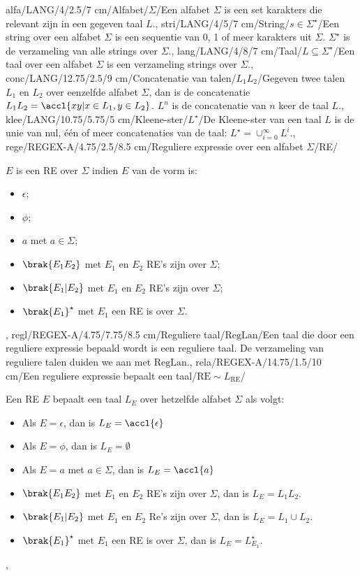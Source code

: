 alfa/LANG/4/2.5/7 cm/Alfabet/{$\Sigma$}/{Een alfabet $\Sigma$ is een set karakters die relevant zijn in een gegeven taal $L$.},
stri/LANG/4/5/7 cm/String/{$s\in\Sigma^{\star}$}/{Een string over een alfabet $\Sigma$ is een sequentie van 0, 1 of meer karakters uit $\Sigma$. $\Sigma^{\star}$ is de verzameling van alle strings over $\Sigma$.},
lang/LANG/4/8/7 cm/Taal/{$L\subseteq\Sigma^{\star}$}/{Een taal over een alfabet $\Sigma$ is een verzameling strings over $\Sigma$.},
conc/LANG/12.75/2.5/9 cm/Concatenatie van talen/{$L_1L_2$}/{Gegeven twee talen $L_1$ en $L_2$ over eenzelfde alfabet $\Sigma$, dan is de concatenatie $L_1L_2=\accl{xy|x\in L_1,y\in L_2}$. $L^n$ is de concatenatie van $n$ keer de taal $L$.},
klee/LANG/10.75/5.75/5 cm/Kleene-ster/{$L^{\star}$}/{De Kleene-ster van een taal $L$ is de unie van nul, \'e\'en of meer concatenaties van de taal: $L^{\star}=\displaystyle\cup_{i=0}^{\infty}{L^i}$.},
rege/REGEX-A/4.75/2.5/8.5 cm/Reguliere expressie over een alfabet $\Sigma$/RE/{$E$ is een RE over $\Sigma$ indien $E$ van de vorm is:\begin{itemize}\item $\epsilon$;\item $\phi$;\item $a$ met $a\in\Sigma$;\item $\brak{E_1E_2}$ met $E_1$ en $E_2$ RE's zijn over $\Sigma$;\item $\brak{E_1|E_2}$ met $E_1$ en $E_2$ RE's zijn over $\Sigma$;\item $\brak{E_1}^{\star}$ met $E_1$ een RE is over $\Sigma$.\end{itemize}},
regl/REGEX-A/4.75/7.75/8.5 cm/Reguliere taal/$\mbox{RegLan}$/{Een taal die door een reguliere expressie bepaald wordt is een reguliere taal. De verzameling van reguliere talen duiden we aan met $\mbox{RegLan}$.},
rela/REGEX-A/14.75/1.5/10 cm/Een reguliere expressie bepaalt een taal/$\mbox{RE}\sim L_{\mbox{RE}}$/{Een RE $E$ bepaalt een taal $L_E$ over hetzelfde alfabet $\Sigma$ als volgt:\begin{itemize}\item Als $E=\epsilon$, dan is $L_E=\accl{\epsilon}$\item Als $E=\phi$, dan is $L_E=\emptyset$\item Als $E=a$ met $a\in\Sigma$, dan is $L_E=\accl{a}$\item $\brak{E_1E_2}$ met $E_1$ en $E_2$ RE's zijn over $\Sigma$, dan is $L_E=L_1L_2$.\item $\brak{E_1|E_2}$ met $E_1$ en $E_2$ Re's zijn over $\Sigma$, dan is $L_E=L_1\cup L_2$.\item $\brak{E_1}^{\star}$ met $E_1$ een RE is over $\Sigma$, dan is $L_E=L_{E_1}^{\star}$.\end{itemize}},
